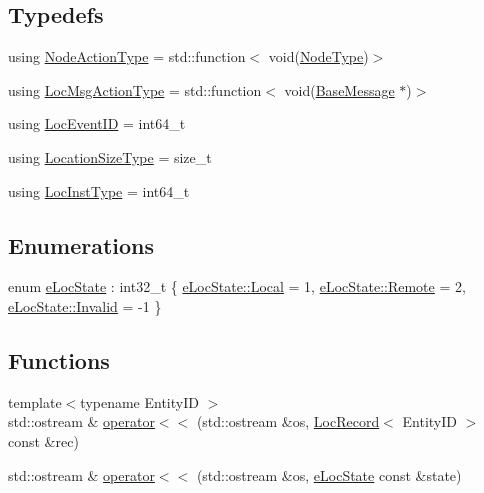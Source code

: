 \subsection*{Typedefs}
\begin{DoxyCompactItemize}
\item 
using \hyperlink{namespacevt_1_1location_a3a9235e0ceb341bef225d2cc46606e9e}{Node\+Action\+Type} = std\+::function$<$ void(\hyperlink{namespacevt_a866da9d0efc19c0a1ce79e9e492f47e2}{Node\+Type})$>$
\item 
using \hyperlink{namespacevt_1_1location_ad0a130e4d79e745543925240e13e8f08}{Loc\+Msg\+Action\+Type} = std\+::function$<$ void(\hyperlink{namespacevt_ac34f95a5e2b8109b55bfba52b074443d}{Base\+Message} $\ast$)$>$
\item 
using \hyperlink{namespacevt_1_1location_aa5ccc1a42aa22b0b41fcfbbdee314dca}{Loc\+Event\+ID} = int64\+\_\+t
\item 
using \hyperlink{namespacevt_1_1location_ab1c4c5849012a23eee2fbd1fce6159d7}{Location\+Size\+Type} = size\+\_\+t
\item 
using \hyperlink{namespacevt_1_1location_a4db6456e8024af2d23fc5ae560fef866}{Loc\+Inst\+Type} = int64\+\_\+t
\end{DoxyCompactItemize}
\subsection*{Enumerations}
\begin{DoxyCompactItemize}
\item 
enum \hyperlink{namespacevt_1_1location_a7a5c74aad68cf57281515029d8521547}{e\+Loc\+State} \+: int32\+\_\+t \{ \hyperlink{namespacevt_1_1location_a7a5c74aad68cf57281515029d8521547a509820290d57f333403f490dde7316f4}{e\+Loc\+State\+::\+Local} = 1, 
\hyperlink{namespacevt_1_1location_a7a5c74aad68cf57281515029d8521547af8508f576cd3f742dfc268258dcdf0dd}{e\+Loc\+State\+::\+Remote} = 2, 
\hyperlink{namespacevt_1_1location_a7a5c74aad68cf57281515029d8521547a4bbb8f967da6d1a610596d7257179c2b}{e\+Loc\+State\+::\+Invalid} = -\/1
 \}
\end{DoxyCompactItemize}
\subsection*{Functions}
\begin{DoxyCompactItemize}
\item 
{\footnotesize template$<$typename Entity\+ID $>$ }\\std\+::ostream \& \hyperlink{namespacevt_1_1location_a71c7f904efd180f1f252dbd6ea72307c}{operator$<$$<$} (std\+::ostream \&os, \hyperlink{structvt_1_1location_1_1_loc_record}{Loc\+Record}$<$ Entity\+ID $>$ const \&rec)
\item 
std\+::ostream \& \hyperlink{namespacevt_1_1location_ae2016d077f335128b8f35b0b2c547c9e}{operator$<$$<$} (std\+::ostream \&os, \hyperlink{namespacevt_1_1location_a7a5c74aad68cf57281515029d8521547}{e\+Loc\+State} const \&state)
\end{DoxyCompactItemize}


